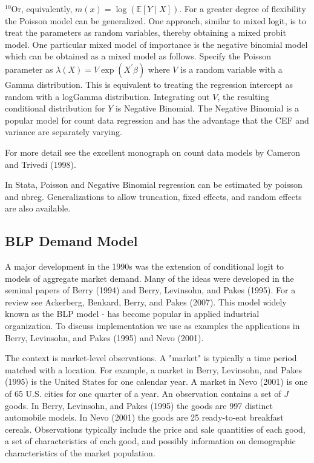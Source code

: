 \documentclass[10pt]{article}
\begin{document}
${ }^{10} \mathrm{Or}$, equivalently, $m(x)=\log (\mathbb{E}[Y \mid X])$. For a greater degree of flexibility the Poisson model can be generalized. One approach, similar to mixed logit, is to treat the parameters as random variables, thereby obtaining a mixed probit model. One particular mixed model of importance is the negative binomial model which can be obtained as a mixed model as follows. Specify the Poisson parameter as $\lambda(X)=V \exp \left(X^{\prime} \beta\right)$ where $V$ is a random variable with a Gamma distribution. This is equivalent to treating the regression intercept as random with a logGamma distribution. Integrating out $V$, the resulting conditional distribution for $Y$ is Negative Binomial. The Negative Binomial is a popular model for count data regression and has the advantage that the CEF and variance are separately varying.

For more detail see the excellent monograph on count data models by Cameron and Trivedi (1998).

In Stata, Poisson and Negative Binomial regression can be estimated by poisson and nbreg. Generalizations to allow truncation, fixed effects, and random effects are also available.

\subsection{BLP Demand Model}
A major development in the 1990s was the extension of conditional logit to models of aggregate market demand. Many of the ideas were developed in the seminal papers of Berry (1994) and Berry, Levinsohn, and Pakes (1995). For a review see Ackerberg, Benkard, Berry, and Pakes (2007). This model widely known as the BLP model - has become popular in applied industrial organization. To discuss implementation we use as examples the applications in Berry, Levinsohn, and Pakes (1995) and Nevo (2001).

The context is market-level observations. A "market" is typically a time period matched with a location. For example, a market in Berry, Levinsohn, and Pakes (1995) is the United States for one calendar year. A market in Nevo (2001) is one of 65 U.S. cities for one quarter of a year. An observation contains a set of $J$ goods. In Berry, Levinsohn, and Pakes (1995) the goods are 997 distinct automobile models. In Nevo (2001) the goods are 25 ready-to-eat breakfast cereals. Observations typically include the price and sale quantities of each good, a set of characteristics of each good, and possibly information on demographic characteristics of the market population.
\end{document}
